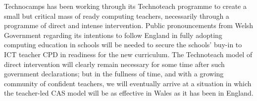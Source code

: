 \documentclass{sig-alternate}
\begin{document}
Technocamps has been working through its Technoteach programme to
create a small but critical mass of ready computing teachers,
necessarily through a programme of direct and intense intervention.
Public pronouncements from Welsh Government regarding its intentions
to follow England in fully adopting computing education
in schools will be needed to secure the schools' buy-in to ICT teacher
CPD in readiness for the new curriculum.  The Technoteach model of
direct intervention will clearly remain necessary for some time after
such government declarations; but in the fullness of time, and with a
growing community of confident teachers, we will eventually arrive at
a situation in which the teacher-led CAS model will be as effective in
Wales as it has been in England.
\break





\end{document}
